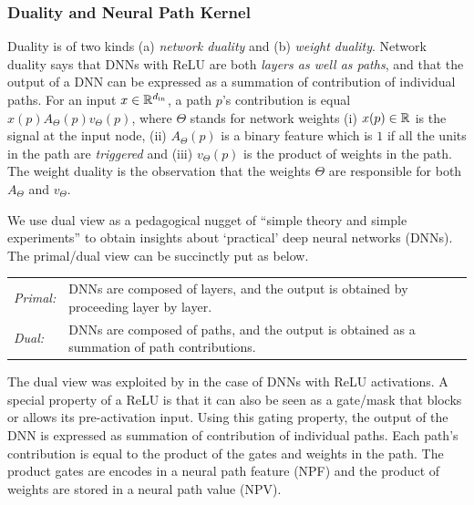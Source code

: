 \documentclass{article}
\begin{document}
\subsubsection{Duality and Neural Path Kernel}
Duality is of two kinds (a) \emph{network duality} and (b) \emph{weight duality}. Network duality says that DNNs with ReLU are both \emph{layers as well as paths}, and that the output of a DNN can be expressed as a summation of contribution of individual paths. For an input $x\in\mathbb{R}^{d_{\text{in}}}$, a path $p$'s contribution is equal $x(p)A_{\Theta}(p)v_{\Theta}(p)$, where $\Theta$ stands for network weights (i) $x(p)\in\mathbb{R}$ is the signal at the input node, (ii) $A_{\Theta}(p)$ is a binary feature which is $1$ if all the units in the path are \emph{triggered} and (iii) $v_{\Theta}(p)$ is the product of weights in the path. The weight duality is the observation that the weights $\Theta$ are responsible for both $A_{\Theta}$ and $v_{\Theta}$. 


We use dual view as a pedagogical nugget of ``simple theory and simple experiments'' \cite{Aliresponse} to obtain insights about `practical' deep neural networks (DNNs). The primal/dual view can be succinctly put as below. 
\begin{center}
\begin{tabular}{p{1cm}p{6cm}}
\emph{Primal:} & DNNs are composed of layers, and the output is obtained by proceeding layer by layer.\\
\emph{Dual:}& DNNs are composed of paths, and the output is obtained as a summation of path contributions.\\
\end{tabular}
\end{center}
 The dual view was exploited by \cite{npk} in the case of DNNs with ReLU activations. A special property of a ReLU is that it can also be seen as a gate/mask that blocks or allows its pre-activation input. 
{Using this gating property, the output of the DNN is expressed as summation of contribution of individual paths. Each path's contribution is equal to the product of the gates and weights in the path. The product gates are encodes in a neural path feature (NPF) and the product of weights are stored in a neural path value (NPV). }
\end{document}
